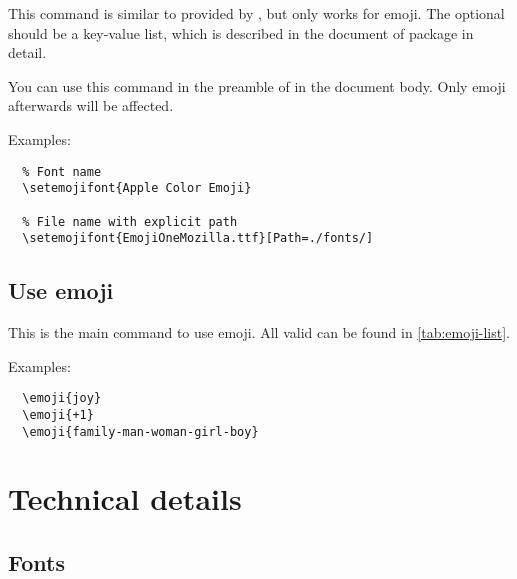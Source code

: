 \documentclass{l3doc}
\begin{document}
\begin{function}{\setemojifont}
  \begin{syntax}
  \end{syntax}
  This command is similar to  provided by , but only works for
  emoji. The optional  should be a key-value list, which is described in the
  document of  package in detail.

  You can use this command in the preamble of in the document body. Only emoji afterwards will
  be affected.
\end{function}

Examples:

\begin{verbatim}
  % Font name
  \setemojifont{Apple Color Emoji}

  % File name with explicit path
  \setemojifont{EmojiOneMozilla.ttf}[Path=./fonts/]
\end{verbatim}

\subsection{ Use emoji}

\begin{function}{\emoji}
  \begin{syntax}
  \end{syntax}
  This is the main command to use emoji. All valid  can be found in
  \autoref{tab:emoji-list}.
\end{function}

Examples:

\begin{verbatim}
  \emoji{joy}
  \emoji{+1}
  \emoji{family-man-woman-girl-boy}
\end{verbatim}

  

\section{ Technical details}

\subsection{ Fonts}
\end{document}
